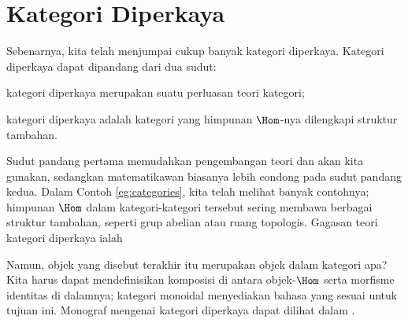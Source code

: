 \section{Kategori Diperkaya}\label{sec:enriched-cat}
Sebenarnya, kita telah menjumpai cukup banyak kategori diperkaya. Kategori diperkaya dapat dipandang dari dua sudut:
\begin{compactitem}
	\item kategori diperkaya merupakan suatu perluasan teori kategori;
	\item kategori diperkaya adalah kategori yang himpunan $\Hom$-nya dilengkapi struktur tambahan.
\end{compactitem}
Sudut pandang pertama memudahkan pengembangan teori dan akan kita gunakan, sedangkan matematikawan biasanya lebih condong pada sudut pandang kedua. Dalam Contoh \ref{eg:categories}, kita telah melihat banyak contohnya; himpunan $\Hom$ dalam kategori-kategori tersebut sering membawa berbagai struktur tambahan, seperti grup abelian atau ruang topologis. Gagasan teori kategori diperkaya ialah
\begin{center}\end{center}
Namun, objek yang disebut terakhir itu merupakan objek dalam kategori apa? Kita harus dapat mendefinisikan komposisi di antara objek-$\Hom$ serta morfisme identitas di dalamnya; kategori monoidal menyediakan bahasa yang sesuai untuk tujuan ini. Monograf mengenai kategori diperkaya dapat dilihat dalam \cite{Ke05}.

